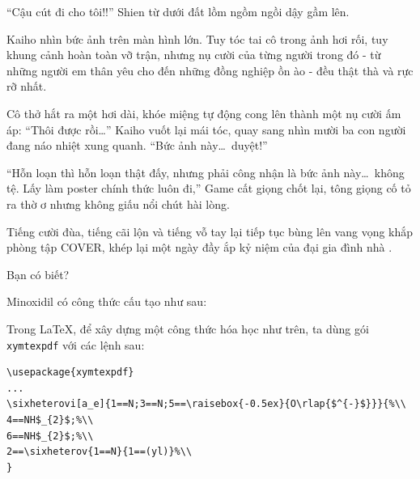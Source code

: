 \documentclass[../main.tex]{subfiles}
\begin{document}
``Cậu cút đi cho tôi!!'' Shien từ dưới đất lồm ngồm ngồi dậy gầm lên.

Kaiho nhìn bức ảnh trên màn hình lớn. Tuy tóc tai cô trong ảnh hơi rối, tuy khung cảnh hoàn toàn vỡ trận, nhưng nụ cười của từng người trong đó - từ những người em thân yêu cho đến những đồng nghiệp ồn ào - đều thật thà và rực rỡ nhất.

Cô thở hắt ra một hơi dài, khóe miệng tự động cong lên thành một nụ cười ấm áp: ``Thôi được rồi\dots'' Kaiho vuốt lại mái tóc, quay sang nhìn mười ba con người đang náo nhiệt xung quanh. ``Bức ảnh này\dots\ duyệt!''

``Hỗn loạn thì hỗn loạn thật đấy, nhưng phải công nhận là bức ảnh này\dots\ không tệ. Lấy làm poster chính thức luôn đi,'' Game cất giọng chốt lại, tông giọng cố tỏ ra thờ ơ nhưng không giấu nổi chút hài lòng.

Tiếng cười đùa, tiếng cãi lộn và tiếng vỗ tay lại tiếp tục bùng lên vang vọng khắp phòng tập COVER, khép lại một ngày đầy ắp kỷ niệm của đại gia đình nhà \hls.

\begin{center}
  {\abv\Large Bạn có biết?}
\end{center}

Minoxidil có công thức cấu tạo như sau:

\begin{center}
\end{center}

Trong LaTeX, để xây dựng một công thức hóa học như trên, ta dùng gói \texttt{xymtexpdf} với các lệnh sau:

\begin{verbatim}
\usepackage{xymtexpdf}
...
\sixheterovi[a_e]{1==N;3==N;5==\raisebox{-0.5ex}{O\rlap{$^{-}$}}}{%\\
4==NH$_{2}$;%\\
6==NH$_{2}$;%\\
2==\sixheterov{1==N}{1==(yl)}%\\
}
\end{verbatim}
\end{document}

